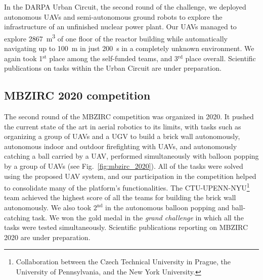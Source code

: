 \documentclass[a4paper,11pt,titlepage,twoside]{book}
\newcommand{\reffig}[1]{Fig.~\ref{#1}}
\begin{document}
  In the \ac{DARPA} Urban Circuit, the second round of the challenge, we deployed autonomous \acp{UAV} and semi-autonomous ground robots to explore the infrastructure of an unfinished nuclear power plant.
  Our \acp{UAV} managed to explore \SI{2867}{\meter\cubed} of one floor of the reactor building while automatically navigating up to \SI{100}{\meter} in just \SI{200}{\second} in a completely unknown environment.
  We again took 1$^{\text{st}}$ place among the self-funded teams, and 3$^{\text{rd}}$ place overall.
  Scientific publications on tasks within the Urban Circuit are under preparation.

  \subsection{MBZIRC 2020 competition}

  The second round of the \ac{MBZIRC} competition was organized in 2020.
  It pushed the current state of the art in aerial robotics to its limits, with tasks such as organizing a group of \acp{UAV} and a \ac{UGV} to build a brick wall autonomously, autonomous indoor and outdoor firefighting with \acp{UAV}, and autonomously catching a ball carried by a \ac{UAV}, performed simultaneously with balloon popping by a group of \acp{UAV} (see \reffig{fig:mbzirc_2020}).
  All of the tasks were solved using the proposed UAV system, and our participation in the competition helped to consolidate many of the platform's functionalities.
  The CTU-UPENN-NYU\footnote{Collaboration between the Czech Technical University in Prague, the University of Pennsylvania, and the New York University.} team achieved the highest score of all the teams for building the brick wall autonomously.
  We also took $2^{\text{nd}}$ in the autonomous balloon popping and ball-catching task.
  We won the gold medal in the \emph{grand challenge} in which all the tasks were tested simultaneously.
  Scientific publications reporting on \ac{MBZIRC} 2020 are under preparation.
\end{document}
